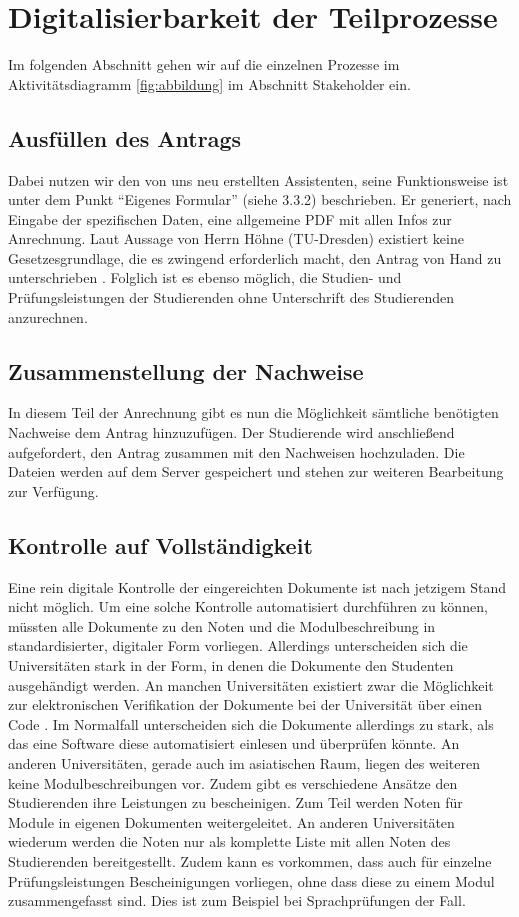 \section{Digitalisierbarkeit der Teilprozesse}

Im folgenden Abschnitt gehen wir auf die einzelnen Prozesse im Aktivitätsdiagramm \cref{fig:abbildung} im Abschnitt Stakeholder ein.

\subsection{Ausfüllen des Antrags}
Dabei nutzen wir den von uns neu erstellten Assistenten, seine Funktionsweise ist unter dem Punkt “Eigenes Formular” (siehe 3.3.2) beschrieben. Er generiert, nach Eingabe der spezifischen Daten, eine allgemeine PDF mit allen Infos zur Anrechnung. Laut Aussage von Herrn Höhne (TU-Dresden) existiert keine Gesetzesgrundlage, die es zwingend erforderlich macht, den Antrag von Hand zu unterschrieben \parencite{email}. Folglich ist es ebenso möglich, die Studien- und Prüfungsleistungen der Studierenden ohne Unterschrift des Studierenden anzurechnen.

\subsection{Zusammenstellung der Nachweise}
In diesem Teil der Anrechnung gibt es nun die Möglichkeit sämtliche benötigten Nachweise dem Antrag hinzuzufügen. Der Studierende wird anschließend aufgefordert, den Antrag zusammen mit den Nachweisen hochzuladen. Die Dateien werden auf dem Server gespeichert und stehen zur weiteren Bearbeitung zur Verfügung.

\subsection{Kontrolle auf Vollständigkeit}
Eine rein digitale Kontrolle der eingereichten Dokumente ist nach jetzigem Stand nicht möglich. Um eine solche Kontrolle automatisiert durchführen zu können, müssten alle Dokumente zu den Noten und die Modulbeschreibung in standardisierter,  digitaler Form vorliegen. Allerdings unterscheiden sich die Universitäten stark in der Form, in denen die Dokumente den Studenten ausgehändigt werden. An manchen Universitäten existiert zwar die Möglichkeit zur elektronischen Verifikation der Dokumente bei der Universität über einen Code \parencite{goettingen}. Im Normalfall unterscheiden sich die Dokumente allerdings zu stark, als das eine Software diese automatisiert einlesen und überprüfen könnte. An anderen Universitäten, gerade auch im asiatischen Raum, liegen des weiteren keine Modulbeschreibungen vor. Zudem gibt es verschiedene Ansätze den Studierenden ihre Leistungen zu bescheinigen. Zum Teil werden Noten für Module in eigenen Dokumenten weitergeleitet. An anderen Universitäten wiederum werden die Noten nur als komplette Liste mit allen Noten des Studierenden bereitgestellt. Zudem kann es vorkommen, dass auch für einzelne Prüfungsleistungen Bescheinigungen vorliegen, ohne dass diese zu einem Modul zusammengefasst sind. Dies ist zum Beispiel bei Sprachprüfungen der Fall. 

